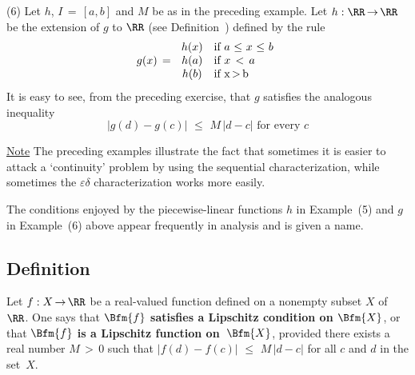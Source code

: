 
\V

        (6) Let $h$, $I \,=\, [a,b]$ and $M$ be as in the preceding example. Let $h:{\RR} \,{\rightarrow}\, {\RR}$ be the extension of $g$ to ${\RR}$ (see Definition~) defined by the rule
        \begin{displaymath}
        g(x) \,=\, 
        \begin{array}{cl}
        h(x) & \mbox{if $a\,\,{\leq}\,\,x\,\,{\leq}\,\,b$} \\
        h(a) & \mbox{if $x\,<\,a$} \\
        h(b) & \mbox{if x\,>\,b}
        \end{array}
        \end{displaymath}
    It is easy to see, from the preceding exercise, that $g$ satisfies the analogous inequality
        \begin{displaymath}
        |g(d) - g(c)|\,\,{\leq}\,\,M\,|d-c| \mbox{ for every $c$}
        \end{displaymath}


\V

        \underline{Note} The preceding examples illustrate the fact that sometimes it is easier to attack a `continuity' problem
    by using the sequential characterization, while sometimes the ${\varepsilon}{\delta}$ characterization works more easily.

\VV

        The conditions enjoyed by the piecewise-linear functions $h$ in Example~(5) and $g$ in Example~(6) above appear frequently in analysis and is given a name.

\V


            \subsection{\small{\bf Definition}}
            \label{DefD20.54}

\V

        Let $f:X \,{\rightarrow}\, {\RR}$ be a real-valued function defined on a nonempty subset $X$ of~${\RR}$.
    One says that {\bf $\Bfm{f}$ satisfies a Lipschitz condition on $\Bfm{X}$}, or that {\bf $\Bfm{f}$ is a Lipschitz function on~$\Bfm{X}$},
    provided there exists a real number $M\,>\,0$
    such that $|f(d)-f(c)|\,\,{\leq}\,\,M\,|d-c|$ for all $c$ and $d$ in the set~$X$.

